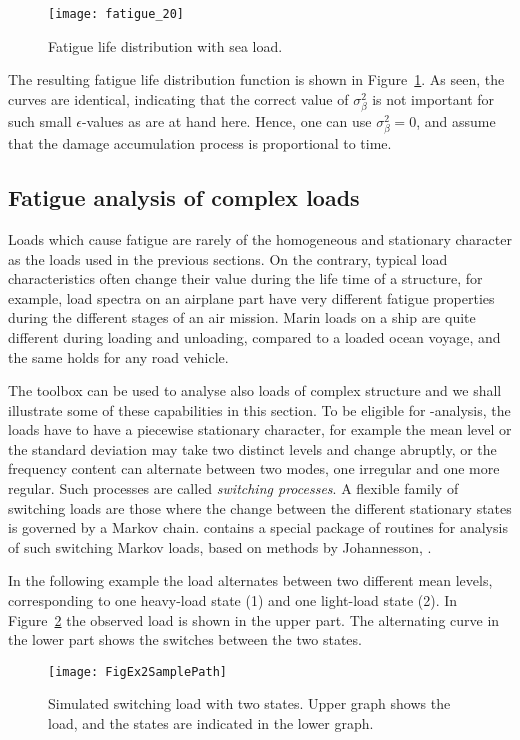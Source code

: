 \begin{figure}[bth]
\centering
\texttt{[image: fatigue\_20]}
\vspace{-3mm}
\caption[Fatigue life distribution with sea load]
{Fatigue life distribution with sea load.}
\label{fatigue_20}
\end{figure}

The resulting fatigue life distribution function
is shown in Figure~\ref{fatigue_20}.
As seen, the curves are identical, indicating that the correct value of
$\sigma _\beta ^2$ is not important for such small $\epsilon$-values
as are at hand here. Hence, one can use $\sigma _\beta ^2 = 0$, and
assume that the damage accumulation process is proportional to time.

\subsection{Fatigue analysis of complex loads}\label{sec:complexloads}
Loads which cause fatigue are rarely of the homogeneous and stationary
character as the loads used in the previous sections. On the contrary,
typical load characteristics often change their value during the life time
of a structure, for example, load spectra on an airplane part have
very different fatigue properties during the different stages of an
air mission. Marin loads on a ship are quite different during 
loading and unloading, compared to a loaded ocean voyage, and the
same holds for any road vehicle.

The \progname{} toolbox
can be used to analyse also loads of complex structure
and we shall illustrate some of these capabilities in this section.
To be eligible for \progname-analysis, the loads have to have a
piecewise stationary character, for example the mean level or the standard
deviation may take two distinct levels and change abruptly,
or the frequency content can alternate between
two modes, one irregular and one more regular. Such processes are called
{\it switching processes}.
A flexible family of switching loads are those
where the change between the different stationary states is governed by
a Markov chain. \progname{}
contains a special package of routines for analysis
of such switching Markov loads, based on methods by Johannesson,  
\cite{Johannesson1998Rainflow,Johannesson1999Rainflow}.

In the following example the load alternates between two different
mean levels, corresponding to one heavy-load state (1) and one light-load
state (2). In Figure~\ref{fatigue_21} the observed load is shown
in the upper part. The alternating curve in the lower part shows
the switches between the two states.
\begin{figure}[bth]
  \centering
    \texttt{[image: FigEx2SamplePath]}
\vspace{-3mm}
\caption[Simulated switching load with two states]
{Simulated switching load with two states. Upper graph shows the
load, and the states are indicated in the lower graph.}
\label{fatigue_21}
\end{figure}

